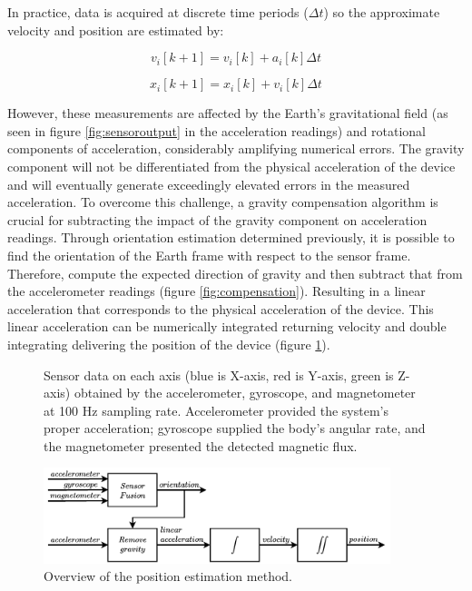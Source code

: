 In practice, data is acquired at discrete time periods ($\Delta t$) so the approximate velocity and position are estimated by:

\begin{equation}
    v_i[k+1]= v_i[k]+a_i[k]\Delta t
\end{equation}

\begin{equation}
    x_i[k+1]= x_i[k]+v_i[k]\Delta t
\end{equation}

However, these measurements are affected by the Earth's gravitational field (as seen in figure \ref{fig:sensoroutput} in the acceleration readings) and rotational components of acceleration, considerably amplifying numerical errors. The gravity component will not be differentiated from the physical acceleration of the device and will eventually generate exceedingly elevated errors in the measured acceleration. To overcome this challenge, a gravity compensation algorithm is crucial for subtracting the impact of the gravity component on acceleration readings. Through orientation estimation determined previously, it is possible to find the orientation of the Earth frame with respect to the sensor frame. Therefore, compute the expected direction of gravity and then subtract that from the accelerometer readings (figure \ref{fig:compensation}). Resulting in a linear acceleration that corresponds to the physical acceleration of the device. This linear acceleration can be numerically integrated returning velocity and double integrating delivering the position of the device (figure \ref{fig:position}).


\begin{figure}
    \centering
    \resizebox{1\linewidth}{!}{}
    \caption{Sensor data on each axis (blue is X-axis, red is Y-axis, green is Z-axis) obtained by the accelerometer, gyroscope, and magnetometer at 100 Hz sampling rate. Accelerometer provided the system's proper acceleration; gyroscope supplied the body's angular rate, and the magnetometer presented the detected magnetic flux.}
\end{figure}

\begin{figure}[!h]
    \centering
    \includegraphics[width=0.9\textwidth]{figures/orientation_position.pdf}
    \caption{Overview of the position estimation method.}
    \label{fig:position}
\end{figure}

